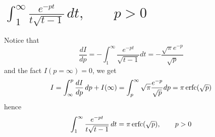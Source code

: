 \section{$\int_1^{\infty} \frac{ e^{-pt} }{ t \sqrt{t-1} } \, dt, \qquad p>0 $}
Notice that
\[
  \frac{dI}{dp} = - \int_1^{\infty} \frac{e^{-pt}}{\sqrt{t-1}} dt
                = - \frac{\sqrt{\pi} e^{-p} }{ \sqrt{p} }
\]
and the fact $I(p=\infty)=0$, we get
\[
  I = \int_{\infty}^p \frac{dI}{dp} \, dp + I(\infty)
    = \int_p^{\infty} \sqrt{\pi} \frac{e^{-p}}{\sqrt{p}} dp
    = \pi \operatorname*{erfc}(\sqrt{p})
\]
hence
\begin{equation}  \label{E:int6}
  \int_1^{\infty} \frac{ e^{-pt} }{ t \sqrt{t-1} } \, dt = \pi \operatorname*{erfc}(\sqrt{p}), 
     \qquad p>0 
\end{equation}




